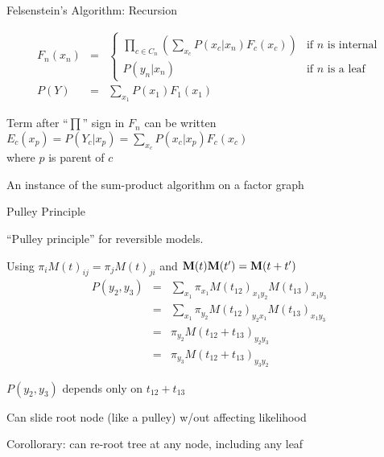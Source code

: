\documentclass{beamer}
\begin{document}
\begin{frame}{Felsenstein's Algorithm: Recursion}

\begin{eqnarray*}
F_n(x_n) & = & \left\{ \begin{array}{ll} \displaystyle
\prod_{\mbox{$c \in C_n$}} \left( \sum_{x_c} P(x_c|x_n) F_c(x_c) \right) & \mbox{if $n$ is internal} \\
P(y_n|x_n) & \mbox{if $n$ is a leaf}
\end{array} \right. \\
P(Y) & = & \sum_{x_1} P(x_1) F_1(x_1)
\end{eqnarray*}

\itemb
  \item Term after ``$\prod$'' sign in $F_n$ can be written $E_c(x_p) = P(Y_c|x_p) = \sum_{x_c} P(x_c|x_p) F_c(x_c)$ \\ where $p$ is parent of $c$
  \item An instance of the \alert{sum-product algorithm} on a factor graph
\iteme

\end{frame}

\begin{frame}{Pulley Principle}

\itemb
\item ``Pulley principle'' for reversible models. %
\Tree [ .1 2 3 ]
 \itemb
 \item Using $\pi_i M(t)_{ij} = \pi_j M(t)_{ji}$ and ${\bf M}(t){\bf M}(t')={\bf M}(t+t')$
\begin{eqnarray*}
P(y_2,y_3) & = & \sum_{x_1} \pi_{x_1} M(t_{12})_{x_1 y_2} M(t_{13})_{x_1 y_3} \\
& = & \sum_{x_1} \pi_{y_2} M(t_{12})_{y_2 x_1} M(t_{13})_{x_1 y_3} \\
& = & \pi_{y_2} M(t_{12}+t_{13})_{y_2 y_3} \\
& = & \pi_{y_3} M(t_{12}+t_{13})_{y_3 y_2}
\end{eqnarray*}
 \item $P(y_2,y_3)$ depends only on $t_{12}+t_{13}$
 \item Can slide root node (like a pulley) w/out affecting likelihood 
 \item Corollorary: can re-root tree at any node, including any leaf
 \iteme
\iteme

\end{frame}
\end{document}
